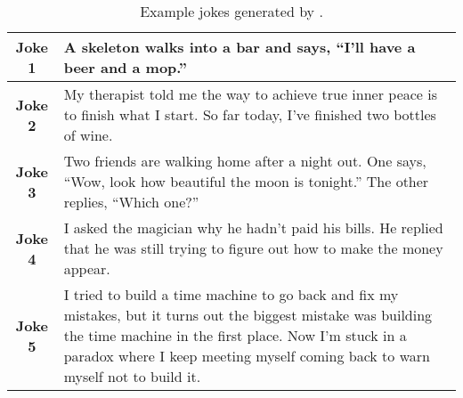 \begin{table}[!htbp]
    \centering
    \caption{Example jokes generated by \ours.}
    \label{tab:example_jokes}
    \begin{tabular}{c p{}}
    \toprule
    \textbf{Joke 1} & A skeleton walks into a bar and says, “I’ll have a beer and a mop.”\\
    \midrule
    \textbf{Joke 2} & My therapist told me the way to achieve true inner peace is to finish what I start. So far today, I’ve finished two bottles of wine.\\
    \midrule
    \textbf{Joke 3} & Two friends are walking home after a night out. One says, “Wow, look how beautiful the moon is tonight.” The other replies, “Which one?” \\
    \midrule
    \textbf{Joke 4} & I asked the magician why he hadn’t paid his bills. He replied that he was still trying to figure out how to make the money appear.\\
    \midrule
    \textbf{Joke 5} & I tried to build a time machine to go back and fix my mistakes, but it turns out the biggest mistake was building the time machine in the first place. Now I'm stuck in a paradox where I keep meeting myself coming back to warn myself not to build it. \\
    \bottomrule
    \end{tabular}
\end{table}


